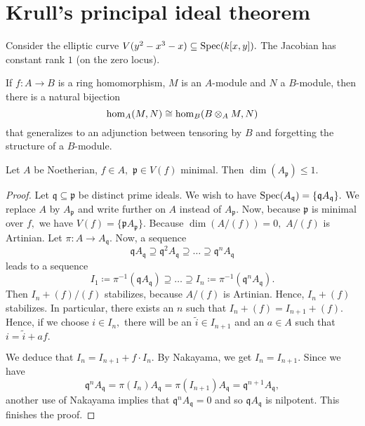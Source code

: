 \section{Krull's principal ideal theorem}

\begin{example}
  Consider the elliptic curve
  \(V(y^2-x^3-x) \subseteq \text{Spec}(k[x, y]).\)
  The Jacobian has constant rank \(1\) (on the zero locus).
\end{example}

\begin{note}
  If \(f \colon A \to B\) is a ring homomorphism, \(M\) is an \(A\)-module and \(N\) a \(B\)-module, then there is a natural bijection
  \[\hom_A(M, N) \cong \hom_B(B \otimes_A M, N)\]
  that generalizes to an adjunction between tensoring by \(B\) and forgetting the structure of a \(B\)-module.
\end{note}

\begin{theorem}
  \label{krull's principal ideal theorem}
  Let \(A\) be Noetherian, \(f \in A,\) \(\mathfrak p \in V(f)\) minimal. Then \(\dim(A_{\mathfrak p}) \leq 1.\)
\end{theorem}
\begin{proof}
  Let \(\mathfrak q \subseteq \mathfrak p\) be distinct prime ideals. We wish to have
  \(\text{Spec}(A_{\mathfrak q}) = \{ \mathfrak q A_{\mathfrak q}\}.\)
  We replace \(A\) by \(A_{\mathfrak p}\) and write further on \(A\) instead of \(A_{\mathfrak p}.\)
  Now, because \(\mathfrak p\) is minimal over \(f,\) we have
  \(V(f) = \{\mathfrak p A_{\mathfrak p}\}.\)
  Because \(\dim(A/{(f)}) = 0,\) \(A/{(f)}\) is Artinian.
  Let \(\pi \colon A \to A_{\mathfrak q}.\) Now, a sequence
  \[\mathfrak q A_{\mathfrak q} \supseteq \mathfrak q^2 A_{\mathfrak q} \supseteq \dotso \supseteq \mathfrak q^n A_{\mathfrak q}\]
  leads to a sequence
  \[I_1 \coloneqq \pi^{-1}(\mathfrak q A_{\mathfrak q}) \supseteq \dotso \supseteq I_n \coloneqq \pi^{-1}(\mathfrak{q}^n A_{\mathfrak{q}}).\]
  Then \(I_n+(f)/{(f)}\) stabilizes, because \(A/{(f)}\) is Artinian. Hence, \(I_n + (f)\) stabilizes. In particular, there exists an \(n\) such that \(I_n + (f) = I_{n+1} + (f).\)
  Hence, if we choose \(i \in I_n,\) there will be an \(\tilde{i} \in I_{n+1}\) and an \(a \in A\) such that
  \(i = \tilde{i} + af.\)

  We deduce that \(I_n = I_{n+1} + f \cdot I_n\). By Nakayama,
  we get \(I_n = I_{n+1}.\)
  Since we have
  \[\mathfrak q^n A_{\mathfrak q} = \pi(I_n)A_{\mathfrak q} = \pi(I_{n+1}) A_{\mathfrak q} = \mathfrak q^{n+1} A_{\mathfrak q},\]
  another use of Nakayama implies that \(\mathfrak q^n A_{\mathfrak q} = 0\) and so \(\mathfrak q A_{\mathfrak q}\) is nilpotent.
  This finishes the proof.
\end{proof}

